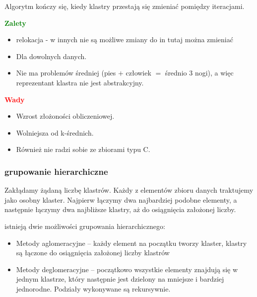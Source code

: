 Algorytm kończy się, kiedy klastry przestają się zmieniać pomiędzy iteracjami.

\begin{minipage}[t]{0.49\textwidth}
    \begin{center}
        \textbf{\textcolor{green}{Zalety}}    
    \end{center}
    \begin{itemize}
        \item relokacja - w innych nie są możliwe zmiany do in   tutaj można zmieniać
        \item Dla dowolnych danych.
        \item Nie ma problemów średniej (pies $+$ człowiek $=$ średnio $3$ nogi), a więc reprezentant klastra nie jest abstrakcyjny.
    \end{itemize}
    \end{minipage}
    \begin{minipage}[t]{0.49\textwidth}  
    \begin{center}
        \textbf{\textcolor{red}{Wady}}
    \end{center}
    \begin{itemize}
        \item Wzrost złożoności obliczeniowej.
        \item Wolniejsza od k-średnich.
        \item Również nie radzi sobie ze zbiorami typu C.
    \end{itemize}    
    \end{minipage}

\subsubsection{grupowanie hierarchiczne}

Zakłądamy żądaną liczbę klastrów. Każdy z elementów zbioru danych traktujemy jako osobny klaster. Najpierw łączymy dwa najbardziej podobne elementy, a następnie łączymy dwa najbliższe klastry, aż do osiągnięcia założonej liczby.


istnieją dwie możliwości grupowania hierarchicznego:
\begin{itemize}
    \item Metody aglomeracyjne -- każdy element na początku tworzy klaster, klastry są łączone do osiągnięcia założonej liczby klastrów
    \item Metody deglomeracyjne -- początkowo wszystkie elementy znajdują się w jednym klastrze, który następnie jest dzielony na mniejsze i bardziej jednorodne. Podziały wykonywane są rekursywnie.
\end{itemize}

